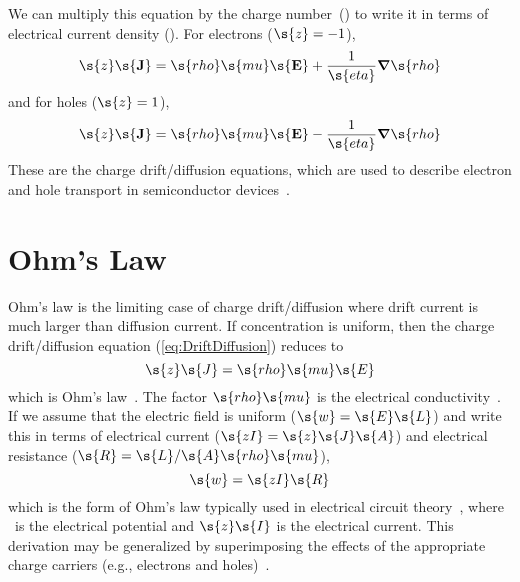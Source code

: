 We can multiply this equation by the charge number~() to write it in terms of electrical current density ().  For electrons ($\s{z} = -1$),
\begin{equation}
  \s{z}\mathbf{\s{J}} = \s{rho}\s{mu}\mathbf{\s{E}} + \frac{1}{\s{eta}}\boldsymbol{\nabla}\s{rho}
\end{equation}
and for holes ($\s{z} = 1$),
\begin{equation}
  \s{z}\mathbf{\s{J}} = \s{rho}\s{mu}\mathbf{\s{E}} - \frac{1}{\s{eta}}\boldsymbol{\nabla}\s{rho}
\end{equation}
These are the charge drift\slash{}diffusion equations, which are used to describe electron and hole transport in semiconductor devices~\cite{Ashcroft1976, Roulston1999}. %


\section{Ohm's Law}
\label{sec:Ohms}


Ohm's law is the limiting case of charge drift\slash{}diffusion where drift current is much larger than diffusion current.  If concentration is uniform, then the charge drift\slash{}diffusion equation (\ref{eq:DriftDiffusion}) reduces to
\begin{equation}
  \s{z}\s{J} = \s{rho}\s{mu}\s{E}
\end{equation}
which is Ohm's law~\cite{Newman1991, Ashcroft1976, Roulston1999, Young1996}.  The factor $\s{rho}\s{mu}$ is the electrical conductivity~\cite{Roulston1999}.  If we assume that the electric field is uniform ($\s{w} = \s{E}\s{L}$) and write this in terms of electrical current ($\s{zI} = \s{z}\s{J}\s{A}$) and electrical resistance ($\s{R} = \s{L}/\s{A}\s{rho}\s{mu}$),
\begin{equation}
  \s{w} = \s{zI}\s{R}
\end{equation}
which is the form of Ohm's law typically used in electrical circuit theory~\cite{Ashcroft1976, Roulston1999, Young1996, Thomas1998, Horowitz1999}, where ~is the electrical potential and $\s{z}\s{I}$ is the electrical current.  This derivation may be generalized by superimposing the effects of the appropriate charge carriers (e.g., electrons and holes)~\cite{Roulston1999}.

